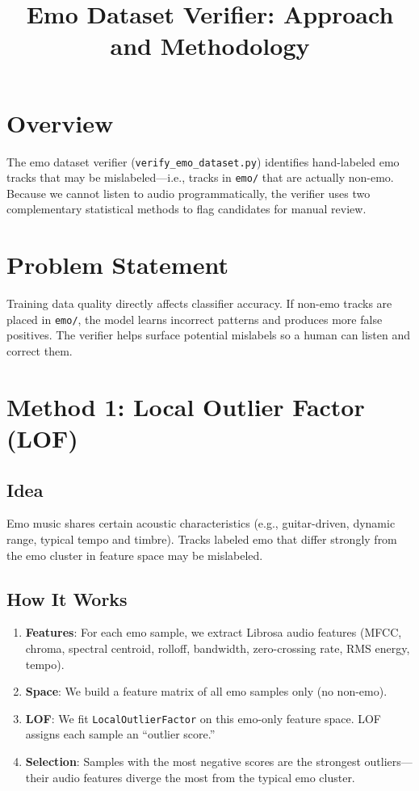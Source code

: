 \documentclass[11pt,a4paper]{article}
\title{Emo Dataset Verifier: Approach and Methodology}
\author{}
\date{}
\begin{document}
\maketitle

\section{Overview}

The emo dataset verifier (\texttt{verify\_emo\_dataset.py}) identifies hand-labeled emo tracks that may be mislabeled---i.e., tracks in \texttt{emo/} that are actually non-emo. Because we cannot listen to audio programmatically, the verifier uses two complementary statistical methods to flag candidates for manual review.

\section{Problem Statement}

Training data quality directly affects classifier accuracy. If non-emo tracks are placed in \texttt{emo/}, the model learns incorrect patterns and produces more false positives. The verifier helps surface potential mislabels so a human can listen and correct them.

\section{Method 1: Local Outlier Factor (LOF)}

\subsection{Idea}

Emo music shares certain acoustic characteristics (e.g., guitar-driven, dynamic range, typical tempo and timbre). Tracks labeled emo that differ strongly from the emo cluster in feature space may be mislabeled.

\subsection{How It Works}

\begin{enumerate}
  \item \textbf{Features}: For each emo sample, we extract Librosa audio features (MFCC, chroma, spectral centroid, rolloff, bandwidth, zero-crossing rate, RMS energy, tempo).
  \item \textbf{Space}: We build a feature matrix of all emo samples only (no non-emo).
  \item \textbf{LOF}: We fit \texttt{LocalOutlierFactor} on this emo-only feature space. LOF assigns each sample an ``outlier score.''
  \item \textbf{Selection}: Samples with the most negative scores are the strongest outliers---their audio features diverge the most from the typical emo cluster.
\end{enumerate}
\end{document}

